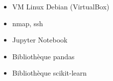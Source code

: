 \documentclass{article}
\begin{document}
\begin{tabular}
\begin{itemize}
\begin{itemize}
            \item \textcolor{gray!100}{VM Linux Debian (VirtualBox)}
            \item \textcolor{gray!100}{nmap, ssh}
            \item \textcolor{gray!100}{Jupyter Notebook}
            \item \textcolor{gray!100}{Bibliothèque pandas}
            \item \textcolor{gray!100}{Bibliothèque scikit-learn}

        \end{itemize}
        
    \end{itemize}
\end{tabular}



\vfill %
\end{document}
